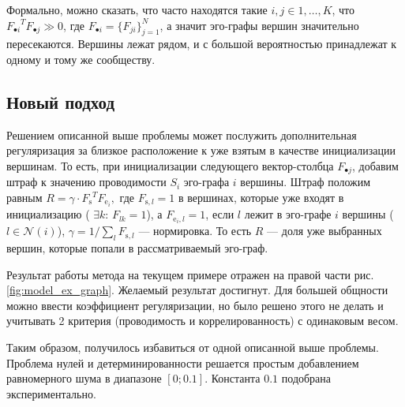 \documentclass{ITaSconf}
\begin{document}
	
	Формально, можно сказать, что часто находятся такие $i,j \in {1,\dots, K}$, что ${F_{\bullet i}}^T F_{\bullet j} \gg 0$, где $F_{\bullet i} = \{F_{j i}\}_{j=1}^N$, а значит эго-графы вершин значительно пересекаются.
	Вершины лежат рядом, и с большой вероятностью принадлежат к одному и тому же сообществу.
	
	\subsection{Новый подход}
	
	Решением описанной выше проблемы может послужить дополнительная регуляризация за близкое расположение к уже взятым в качестве инициализации вершинам.
	То есть, при инициализации следующего вектор-столбца $F_{\bullet j}$, добавим штраф к значению проводимости $S_i$ эго-графа $i$ вершины.
	Штраф положим равным 
	$R = \gamma \cdot {F_{\mathrm{s}}}^T F_{\mathrm{e}_i},$
	где $F_{\mathrm{s}, l} = 1$ в вершинах, которые уже входят в инициализацию ( $\exists k:\, F_{lk}=1 $),
	а $F_{\mathrm{e}_i, l} = 1$, если $l$ лежит в эго-графе $i$ вершины ($l \in \mathcal{N}(i)$),
	$\gamma = 1 / \sum_l F_{\mathrm{s}, l}$ --- нормировка.
	То есть $R$ --- доля уже выбранных вершин, которые попали в рассматриваемый эго-граф.
	
	Результат работы метода на текущем примере отражен на правой части рис. \ref{fig:model_ex_graph}.
	Желаемый результат достигнут.
	Для большей общности можно ввести коэффициент регуляризации, но было решено этого не делать и учитывать 2 критерия (проводимость и коррелированность) с одинаковым весом.
	
	Таким образом, получилось избавиться от одной описанной выше проблемы.
	Проблема нулей и детерминированности решается простым добавлением равномерного шума в диапазоне $[0; 0.1]$.
	Константа $0.1$ подобрана экспериментально.
	
\end{document}
